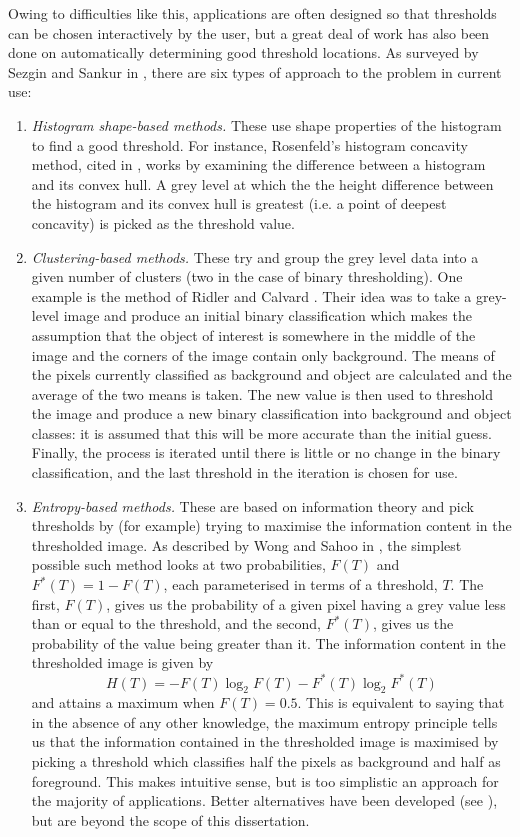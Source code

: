 Owing to difficulties like this, applications are often designed so that thresholds can be chosen interactively by the user, but a great deal of work has also been done on automatically determining good threshold locations. As surveyed by Sezgin and Sankur in \cite{sezgin04}, there are six types of approach to the problem in current use:

\begin{enumerate}

\item \emph{Histogram shape-based methods.} These use shape properties of the histogram to find a good threshold. For instance, Rosenfeld's histogram concavity method, cited in \cite{lee.c92}, works by examining the difference between a histogram and its convex hull. A grey level at which the the height difference between the histogram and its convex hull is greatest (i.e. a point of deepest concavity) is picked as the threshold value.

\item \emph{Clustering-based methods.} These try and group the grey level data into a given number of clusters (two in the case of binary thresholding). One example is the method of Ridler and Calvard \cite{ridler78}. Their idea was to take a grey-level image and produce an initial binary classification which makes the assumption that the object of interest is somewhere in the middle of the image and the corners of the image contain only background. The means of the pixels currently classified as background and object are calculated and the average of the two means is taken. The new value is then used to threshold the image and produce a new binary classification into background and object classes: it is assumed that this will be more accurate than the initial guess. Finally, the process is iterated until there is little or no change in the binary classification, and the last threshold in the iteration is chosen for use.

\item \emph{Entropy-based methods.} These are based on information theory and pick thresholds by (for example) trying to maximise the information content in the thresholded image. As described by Wong and Sahoo in \cite{wong89}, the simplest possible such method looks at two probabilities, $F(T)$ and $F^*(T) = 1 - F(T)$, each parameterised in terms of a threshold, $T$. The first, $F(T)$, gives us the probability of a given pixel having a grey value less than or equal to the threshold, and the second, $F^*(T)$, gives us the probability of the value being greater than it. The information content in the thresholded image is given by
%
\[
H(T) = -F(T) \log_2 F(T) - F^*(T) \log_2 F^*(T)
\]
%
and attains a maximum when $F(T) = 0.5$. This is equivalent to saying that in the absence of any other knowledge, the maximum entropy principle tells us that the information contained in the thresholded image is maximised by picking a threshold which classifies half the pixels as background and half as foreground. This makes intuitive sense, but is too simplistic an approach for the majority of applications. Better alternatives have been developed (see \cite{sezgin04}), but are beyond the scope of this dissertation.


\end{enumerate}
